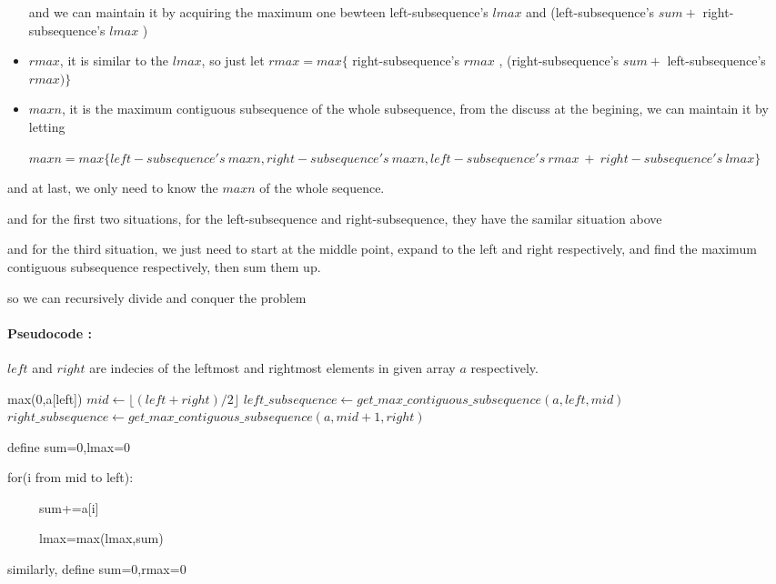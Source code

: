 \begin{solution}
\begin{itemize}
	and we can maintain it by acquiring the maximum one bewteen left-subsequence's $lmax$ and (left-subsequence's $sum+$ right-subsequence's $lmax$	)

	\item $rmax$, it is similar to the $lmax$,
	so just let $rmax=max\{$ right-subsequence's $rmax$ , (right-subsequence's $sum+$ left-subsequence's $rmax)\}$
	
	\item $maxn$, it is the maximum contiguous subsequence of the whole subsequence,
	from the discuss at the begining, we can maintain it by letting 
	
	$maxn=max\{ left-subsequence's \ maxn , right-subsequence's \ maxn , left-subsequence's \ rmax \ +\  right-subsequence's\ lmax\}$
	
\end{itemize}

and at last, we only need to know the $maxn$ of the whole sequence.

\fi

and for the first two situations,
for the left-subsequence and right-subsequence, they have the samilar situation above

and for the third situation, we just need to start at the middle point, expand to the left and right respectively,
and find the maximum contiguous subsequence respectively, then sum them up.

so we can recursively divide and conquer the problem
\paragraph{Pseudocode :}
$left$ and $right$ are indecies of the leftmost and rightmost elements in given array $a$ respectively.
\begin{algorithm}[H]
	\begin{algorithmic}[1]
		\State \Return max(0,a[left])
		\EndIf
		\State $mid\gets \lfloor (left + right)/2 \rfloor$
		\State $left\_subsequence\gets get\_max\_contiguous\_subsequence(a,left,mid)$
		\State $right\_subsequence\gets get\_max\_contiguous\_subsequence(a,mid+1,right)$

		define sum=0,lmax=0

		for(i from mid to left):

		\ \ \ \ \	sum+=a[i]

		\ \ \ \ \ 	lmax=max(lmax,sum)

		similarly, define sum=0,rmax=0


\end{algorithmic}
\end{algorithm}
\end{solution}
